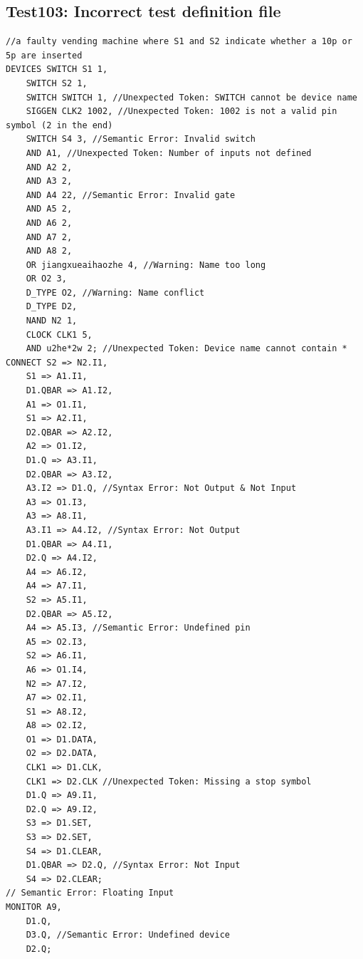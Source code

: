 \documentclass[12pt]{article}
\begin{document}
\subsection{Test103: Incorrect test definition file}
\begin{verbatim}
//a faulty vending machine where S1 and S2 indicate whether a 10p or 5p are inserted
DEVICES	SWITCH S1 1, 
	SWITCH S2 1,
	SWITCH SWITCH 1, //Unexpected Token: SWITCH cannot be device name
	SIGGEN CLK2 1002, //Unexpected Token: 1002 is not a valid pin symbol (2 in the end)
	SWITCH S4 3, //Semantic Error: Invalid switch
	AND A1, //Unexpected Token: Number of inputs not defined
	AND A2 2,
	AND A3 2,
	AND A4 22, //Semantic Error: Invalid gate
	AND A5 2,
	AND A6 2,
	AND A7 2,
	AND A8 2,
	OR jiangxueaihaozhe 4, //Warning: Name too long
	OR O2 3,
	D_TYPE O2, //Warning: Name conflict
	D_TYPE D2,
	NAND N2 1,
	CLOCK CLK1 5,
	AND u2he*2w 2; //Unexpected Token: Device name cannot contain *
CONNECT	S2 => N2.I1,
	S1 => A1.I1,
	D1.QBAR => A1.I2,
	A1 => O1.I1,
	S1 => A2.I1,
	D2.QBAR => A2.I2,
	A2 => O1.I2,
	D1.Q => A3.I1,
	D2.QBAR => A3.I2,
	A3.I2 => D1.Q, //Syntax Error: Not Output & Not Input
	A3 => O1.I3,
	A3 => A8.I1,
	A3.I1 => A4.I2, //Syntax Error: Not Output
	D1.QBAR => A4.I1,
	D2.Q => A4.I2,
	A4 => A6.I2,
	A4 => A7.I1,
	S2 => A5.I1,
	D2.QBAR => A5.I2,
	A4 => A5.I3, //Semantic Error: Undefined pin
	A5 => O2.I3,
	S2 => A6.I1,
	A6 => O1.I4,
	N2 => A7.I2,
	A7 => O2.I1,
	S1 => A8.I2,
	A8 => O2.I2,
	O1 => D1.DATA,
	O2 => D2.DATA,
	CLK1 => D1.CLK,
	CLK1 => D2.CLK //Unexpected Token: Missing a stop symbol
	D1.Q => A9.I1,
	D2.Q => A9.I2,
	S3 => D1.SET,
	S3 => D2.SET,
	S4 => D1.CLEAR,
	D1.QBAR => D2.Q, //Syntax Error: Not Input
	S4 => D2.CLEAR;
// Semantic Error: Floating Input
MONITOR	A9,
	D1.Q,
	D3.Q, //Semantic Error: Undefined device
	D2.Q;
\end{verbatim}
\end{document}
